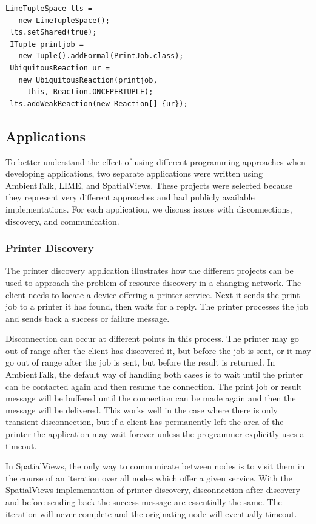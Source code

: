 \begin{lstlisting}[caption={LIME: Print Job Reaction}, label={fig:lpj}]
 LimeTupleSpace lts = 
   new LimeTupleSpace();
 lts.setShared(true);
 ITuple printjob = 
   new Tuple().addFormal(PrintJob.class);
 UbiquitousReaction ur = 
   new UbiquitousReaction(printjob, 
     this, Reaction.ONCEPERTUPLE);
 lts.addWeakReaction(new Reaction[] {ur});
\end{lstlisting}

\subsection{Applications}

To better understand the effect of using different programming approaches when developing applications, two separate applications were written using AmbientTalk, LIME, and SpatialViews. These projects were selected because they represent very different approaches and had publicly available implementations. For each application, we discuss issues with disconnections, discovery, and communication.

\subsubsection{Printer Discovery}

The printer discovery application illustrates how the different projects can be used to approach the problem of resource discovery in a changing network. The client needs to locate a device offering a printer service. Next it sends the print job to a printer it has found, then waits for a reply. The printer processes the job and sends back a success or failure message.

Disconnection can occur at different points in this process. The printer may go out of range after the client has discovered it, but before the job is sent, or it may go out of range after the job is sent, but before the result is returned. In AmbientTalk, the default way of handling both cases is to wait until the printer can be contacted again and then resume the connection. The print job or result message will be buffered until the connection can be made again and then the message will be delivered. This works well in the case where there is only transient disconnection, but if a client has permanently left the area of the printer the application may wait forever unless the programmer explicitly uses a timeout.

In SpatialViews, the only way to communicate between nodes is to visit them in the course of an iteration over all nodes which offer a given service. With the SpatialViews implementation of printer discovery, disconnection after discovery and before sending back the success message are essentially the same. The iteration will never complete and the originating node will eventually timeout.

